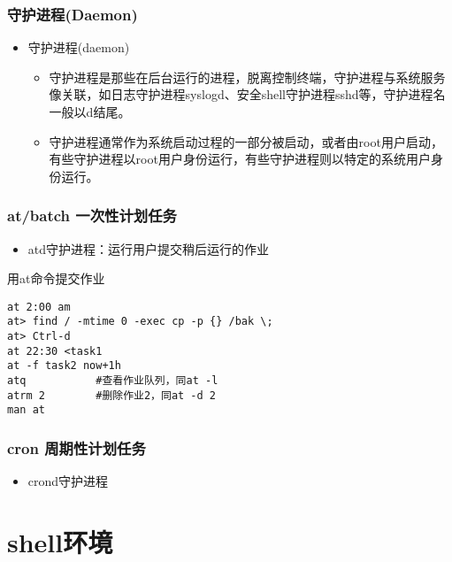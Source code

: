 \documentclass[xcolor=svgnames,presentation]{beamer}
\begin{document}
\begin{frame}
\frametitle{守护进程(Daemon)}
\label{sec-3-1-8}
\begin{itemize}

\item 守护进程(daemon)
\label{sec-3-1-8-1}%
\begin{itemize}

\item 守护进程是那些在后台运行的进程，脱离控制终端，守护进程与系统服务像关联，如日志守护进程syslogd、安全shell守护进程sshd等，守护进程名一般以d结尾。
\label{sec-3-1-8-1-1}%

\item 守护进程通常作为系统启动过程的一部分被启动，或者由root用户启动，有些守护进程以root用户身份运行，有些守护进程则以特定的系统用户身份运行。
\label{sec-3-1-8-1-2}%
\end{itemize} %
\end{itemize} %
\end{frame}
\begin{frame}[fragile]
\frametitle{at/batch 一次性计划任务}
\label{sec-3-1-9}
\begin{itemize}

\item atd守护进程：运行用户提交稍后运行的作业
\label{sec-3-1-9-1}%
\end{itemize} %
\begin{exampleblock}{用at命令提交作业}
\label{sec-3-1-9-2}


\begin{verbatim}
at 2:00 am
at> find / -mtime 0 -exec cp -p {} /bak \;
at> Ctrl-d
at 22:30 <task1
at -f task2 now+1h
atq           #查看作业队列，同at -l
atrm 2        #删除作业2，同at -d 2
man at
\end{verbatim}
\end{exampleblock}
\end{frame}
\begin{frame}
\frametitle{cron 周期性计划任务}
\label{sec-3-1-10}
\begin{itemize}

\item crond守护进程
\label{sec-3-1-10-1}%
\end{itemize} %
\end{frame}
\section{shell环境}
\label{sec-4}
\end{document}
